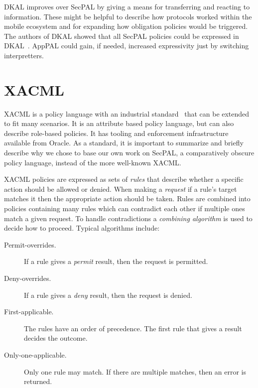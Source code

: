 \documentclass[thesis.tex]{subfiles}
\begin{document}
DKAL improves over SecPAL by giving a means for transferring and
reacting to information. These might be helpful to describe how
protocols worked within the mobile ecosystem and for expanding how
obligation policies would be triggered.  The authors of DKAL showed
that all SecPAL policies could be expressed in
DKAL~\cite{gurevich_dkal:_2008}. AppPAL could gain, if needed,
increased expressivity just by switching interpretters.

\section{XACML}

XACML is a policy language with an industrial
standard~\cite{oasis_extensible_2013} that can be extended to fit many
scenarios. It is an attribute based policy language, but can also describe
role-based policies. It has tooling and enforcement infrastructure available
from Oracle. As a standard, it is important to summarize and briefly describe
why we chose to base our own work on SecPAL, a comparatively obscure policy
language, instead of the more well-known XACML.

XACML policies are expressed as sets of \emph{rules} that describe whether a
specific action should be allowed or denied. When making a \emph{request} if a
rule's target matches it then the appropriate action should be taken. Rules are
combined into policies containing many rules which can contradict each other if
multiple ones match a given request. To handle contradictions a \emph{combining
algorithm} is used to decide how to proceed. Typical algorithms include:

\begin{description}
  \item[Permit-overrides.] If a rule gives a \emph{permit} result, then the request is permitted.
  \item[Deny-overrides.] If a rule gives a \emph{deny} result, then the request is denied.
  \item[First-applicable.] The rules have an order of precedence. The first rule that gives a result decides the outcome.
  \item[Only-one-applicable.] Only one rule may match. If there are multiple matches, then an error is returned.
\end{description}
\end{document}
